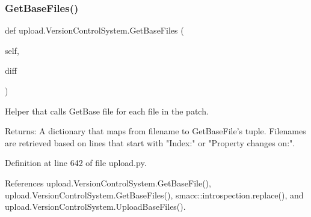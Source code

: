 \mbox{\label{classupload_1_1VersionControlSystem_a812c3b3daf90c88b015fa4b26252e291}} 
\subsubsection{\texorpdfstring{Get\+Base\+Files()}{GetBaseFiles()}\hspace{0.1cm}{\footnotesize\ttfamily [2/2]}}
{\footnotesize\ttfamily def upload.\+Version\+Control\+System.\+Get\+Base\+Files (\begin{DoxyParamCaption}\item[{}]{self,  }\item[{}]{diff }\end{DoxyParamCaption})}

\begin{DoxyVerb}Helper that calls GetBase file for each file in the patch.

Returns:
  A dictionary that maps from filename to GetBaseFile's tuple.  Filenames
  are retrieved based on lines that start with "Index:" or
  "Property changes on:".
\end{DoxyVerb}
 

Definition at line 642 of file upload.\+py.



References upload.\+Version\+Control\+System.\+Get\+Base\+File(), upload.\+Version\+Control\+System.\+Get\+Base\+Files(), smacc\+::introspection.\+replace(), and upload.\+Version\+Control\+System.\+Upload\+Base\+Files().


